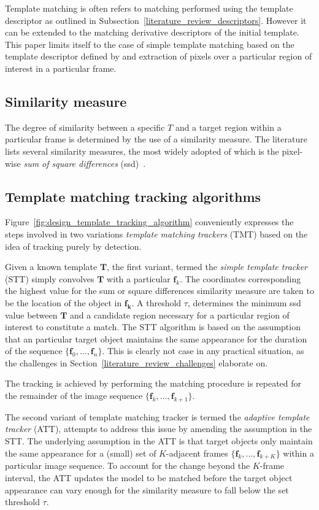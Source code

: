 Template matching is often refers to matching performed using the template
descriptor as outlined in Subsection~\ref{literature_review_descriptors}. However
it can be extended to the matching derivative descriptors of the initial
template.
This paper limits itself to the case of simple template matching based on the
template descriptor defined by and extraction of pixels over a particular region
of interest in a particular frame.

\subsection{Similarity measure}
The degree of similarity between a specific $T$ and a target region
within a particular frame is determined by the use of a similarity
measure. The literature lists several similarity measures, the most widely
adopted of which is the pixel-wise \textit{sum of square differences}
(ssd)~\cite{Brunelli}.

\subsection{Template matching tracking algorithms}\label{theoretical_framework_tm_algorithms}
Figure~\ref{fig:design_template_tracking_algorithm} conveniently expresses the
steps involved in two variations \textit{template matching trackers} (TMT) based
on the idea of tracking purely by detection.

Given a known template $\mathbf{T}$, the first variant, termed the
\textit{simple template tracker} (STT) simply convolves $\mathbf{T}$ with a
particular $\mathbf{f}_k$. The coordinates corresponding the highest value for
the sum or square differences similarity measure are taken to be the location of the object
in $\mathbf{f_k}$. A threshold $\tau$, determines the minimum ssd value between
$\mathbf{T}$ and a candidate region necessary for a particular region of interest to
constitute a match.
The STT algorithm is based on the assumption that an particular target object
maintains the same appearance for the duration of the sequence
$\{\mathbf{f}_0,\ldots,\mathbf{f}_n\}$. This is clearly not case in any practical
situation, as the challenges in Section~\ref{literature_review_challenges}
elaborate on.

The tracking is achieved by performing the matching procedure is repeated for
the remainder of the image sequence $\{\mathbf{f}_k,\ldots,\mathbf{f}_{k+1}\}$.

The second variant of template matching tracker is termed the \textit{adaptive
template tracker} (ATT), attempts to address this issue by amending the
assumption in the STT\@. The underlying assumption in the ATT is that target
objects only maintain the same appearance for a (small) set of $K$-adjacent
frames $\{\mathbf{f}_k,\ldots, \mathbf{f}_{k+K}\}$ within a particular image
sequence. To account for the change beyond the $K$-frame interval, the ATT
updates the model to be matched before the target object appearance can vary
enough for the similarity measure to fall below the set threshold $\tau$.

